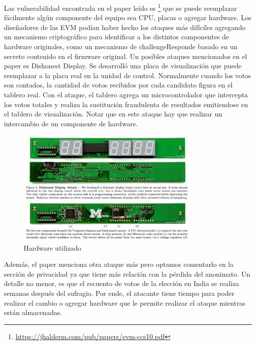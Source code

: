 Las vulnerabilidad encontrada en el paper leído es
\footnote{\url{https://jhalderm.com/pub/papers/evm-ccs10.pdf}}
que se puede reemplazar fácilmente algún componente del equipo sea CPU, placas o agregar hardware. Los diseñadores de las EVM podían haber hecho los ataques más difíciles agregando un mecanismo criptográfico para identificar a los distintos componentes de hardware originales, como un mecanismo de challengeResponde basado en un secreto contenido en el firmware original. 
Un posibles ataques mencionados en el paper es Dishonest Display.
Se desarrolló una placa de visualización que puede reemplazar a la placa real en la unidad de control. Normalmente cuando los votos son contados, la cantidad de votos recibidos por cada candidato figura en el tablero real. Con el ataque, el tablero agrega un microcontrolador que intercepta los votos totales y realiza la sustitución fraudulenta de resultados emitiendose en el tablero de visualización. Notar que en este ataque hay que realizar un intercambio de un componente de hardware.

\begin{figure}[h]
\includegraphics[width=0.8\textwidth]{Imagenes/almacenamiento2}
\caption{Hardware utilizado}
\end{figure}

Además, el paper menciona otra ataque más pero optamos comentarlo en la sección de privacidad ya que tiene más relación con la pérdida del anonimato.
Un detalle no menor, es que el recuento de votos de la  elección en India se realiza semanas después del sufragio. Por ende, el atacante tiene tiempo para poder realizar el cambio o agregar hardware que le permite realizar el ataque mientras están almacenadas.

